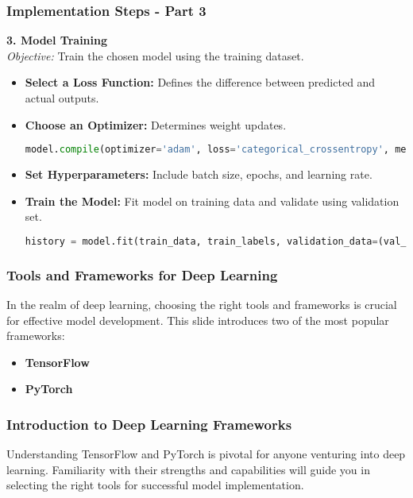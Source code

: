 \documentclass[aspectratio=169]{beamer}
\begin{document}
\begin{frame}[fragile]
    \frametitle{Implementation Steps - Part 3}
    \footnotesize
    \textbf{3. Model Training} \\
    \textit{Objective:} Train the chosen model using the training dataset.
    \begin{itemize}
        \item \textbf{Select a Loss Function:} Defines the difference between predicted and actual outputs.
        \item \textbf{Choose an Optimizer:} Determines weight updates.
        \begin{lstlisting}[language=Python]
model.compile(optimizer='adam', loss='categorical_crossentropy', metrics=['accuracy'])
        \end{lstlisting}
        \item \textbf{Set Hyperparameters:} Include batch size, epochs, and learning rate.
        \item \textbf{Train the Model:} Fit model on training data and validate using validation set.
        \begin{lstlisting}[language=Python]
history = model.fit(train_data, train_labels, validation_data=(val_data, val_labels), epochs=50, batch_size=32)
        \end{lstlisting}
    \end{itemize}
\end{frame}

\begin{frame}
    \frametitle{Tools and Frameworks for Deep Learning}
    In the realm of deep learning, choosing the right tools and frameworks is crucial for effective model development. This slide introduces two of the most popular frameworks:
    \begin{itemize}
        \item \textbf{TensorFlow}
        \item \textbf{PyTorch}
    \end{itemize}
\end{frame}

\begin{frame}[fragile]
    \frametitle{Introduction to Deep Learning Frameworks}
    Understanding TensorFlow and PyTorch is pivotal for anyone venturing into deep learning. Familiarity with their strengths and capabilities will guide you in selecting the right tools for successful model implementation.
\end{frame}
\end{document}
